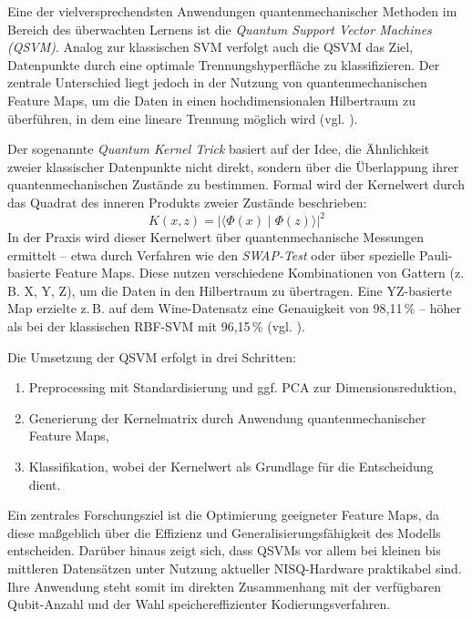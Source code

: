 \vspace{0.3cm}

Eine der vielversprechendsten Anwendungen quantenmechanischer Methoden im Bereich des überwachten Lernens ist die \textit{Quantum Support Vector Machines (QSVM)}. Analog zur klassischen SVM verfolgt auch die QSVM das Ziel, Datenpunkte durch eine optimale Trennungshyperfläche zu klassifizieren. Der zentrale Unterschied liegt jedoch in der Nutzung von quantenmechanischen Feature Maps, um die Daten in einen hochdimensionalen Hilbertraum zu überführen, in dem eine lineare Trennung möglich wird (vgl. \cite{kavithaQuantumMachineLearning2024}).

Der sogenannte \textit{Quantum Kernel Trick} basiert auf der Idee, die Ähnlichkeit zweier klassischer Datenpunkte nicht direkt, sondern über die Überlappung ihrer quantenmechanischen Zustände zu bestimmen. Formal wird der Kernelwert durch das Quadrat des inneren Produkts zweier Zustände beschrieben:
\[
K(x, z) = \left| \langle \Phi(x) \mid \Phi(z) \rangle \right|^2
\]
In der Praxis wird dieser Kernelwert über quantenmechanische Messungen ermittelt – etwa durch Verfahren wie den \textit{SWAP-Test} oder über spezielle Pauli-basierte Feature Maps. Diese nutzen verschiedene Kombinationen von Gattern (z.\,B. X, Y, Z), um die Daten in den Hilbertraum zu übertragen. Eine YZ-basierte Map erzielte z.\,B. auf dem Wine-Datensatz eine Genauigkeit von 98{,}11\,\% – höher als bei der klassischen RBF-SVM mit 96{,}15\,\% (vgl. \cite{kavithaQuantumMachineLearning2024}).

Die Umsetzung der QSVM erfolgt in drei Schritten:
\begin{enumerate}
  \item Preprocessing mit Standardisierung und ggf. PCA zur Dimensionsreduktion,
  \item Generierung der Kernelmatrix durch Anwendung quantenmechanischer Feature Maps,
  \item Klassifikation, wobei der Kernelwert als Grundlage für die Entscheidung dient.
\end{enumerate}

Ein zentrales Forschungsziel ist die Optimierung geeigneter Feature Maps, da diese maßgeblich über die Effizienz und Generalisierungsfähigkeit des Modells entscheiden. Darüber hinaus zeigt sich, dass QSVMs vor allem bei kleinen bis mittleren Datensätzen unter Nutzung aktueller NISQ-Hardware praktikabel sind. Ihre Anwendung steht somit im direkten Zusammenhang mit der verfügbaren Qubit-Anzahl und der Wahl speichereffizienter Kodierungsverfahren.


